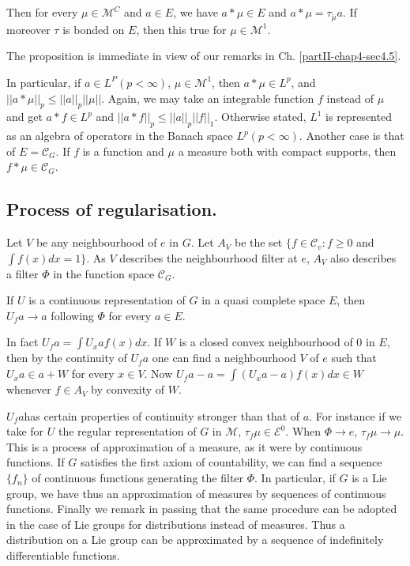Then  for every $\mu \in \mathscr{M}^{C}$ and  $a \in E$, we have $a* \mu
\in E$ and $a*\mu = \tau_{\check{\mu}} a$. If  moreover $\tau$ is
bonded on $E$, then this true for $\mu \in \mathscr{M}^{1}$.  

The proposition is immediate in view  of our remarks in
Ch. \ref{partII-chap4-sec4.5}. 

In particular, if $a\in L^{P}(p < \infty)$, $\mu \in \mathscr{M}^{1}$,
then $a * \mu \in L^{p}$, and 
$ || a*\mu ||_{p} \leq || a ||_{p} || \mu ||$. Again, we may take an
 integrable function $f$ instead  of $ \mu $ and get  $a* f\in L^{p}$
 and $|| a*f ||_{p}\leq   || a ||_{p}||f||_{1}$. Otherwise stated, $L^{1}$ is
 represented as an algebra of operators in the Banach space $L^{p}(p<
 \infty)$. Another case is that of $E =\mathscr{C}_{G}$. If  $f$ is a
 function and $\mu$ a measure both with compact supports, then $f*
 \mu \in \mathscr{C}_{G}$. 

\subsection{Process of regularisation.}\label{partII-chap4-sec4.7}%

Let $V$ be any neighbourhood of $e$  in $G$. Let $A_{V}$  be  the set
$\big\{f \in \mathscr{C}_{v}: f \geq 0$ and $ \int f
(x)dx=1\big\}$. As $V$ describes the neighbourhood filter at $e$,
$A_{V}$ also describes a filter $\Phi$ in the function space
$\mathscr{C}_{G}$. 

\begin{proposition}\label{partII-chap4-prop3}%
 If $U$ is a continuous representation of $G$ in a quasi complete space
 $E$, then $U_{f}a \rightarrow a $ following $\Phi$  for every 
 $a \in  E$. 
\end{proposition} 
  
In fact $U_{f}a =  \int U_{x}af(x)dx$. If $W$ is a closed convex
neighbourhood of $0$ in $E$, then by the continuity of $U_{f}a$ one
can find a neighbourhood  $V$ of $e$ such that $ U_{x}a \in a + W $
for every $x \in V$. Now $U_{f}a -a =\int(U_{x}a-a)f(x)dx \in W$
whenever $f \in A_{V} $ by convexity of $W$. 

\begin{remark*}%
$U_{f}a$\pageoriginale has certain properties of continuity stronger than that of
  $a$. For instance if we take for $U$ the regular representation of
  $G$ in $\mathscr{M}$,  $\tau_f \mu \in \mathscr{E}^0$. When $\Phi \rightarrow
  e$, $\tau_{f} \mu \rightarrow \mu$. This is a process of approximation 
 of a measure, as it were by continuous  functions. If $G$  satisfies
 the first axiom of countability, we can find a sequence  $\{f_{n} \}$
 of continuous  functions generating the filter $\Phi$. In particular,
 if $G$ is a Lie group, we have thus an approximation 
 of measures by sequences of continuous  functions. Finally we  remark
 in passing that the same procedure  can be adopted in the case of Lie
 groups for distributions  instead of measures. Thus a distribution on
 a Lie  group  can be approximated by a sequence of indefinitely
 differentiable  functions. 
\end{remark*}
